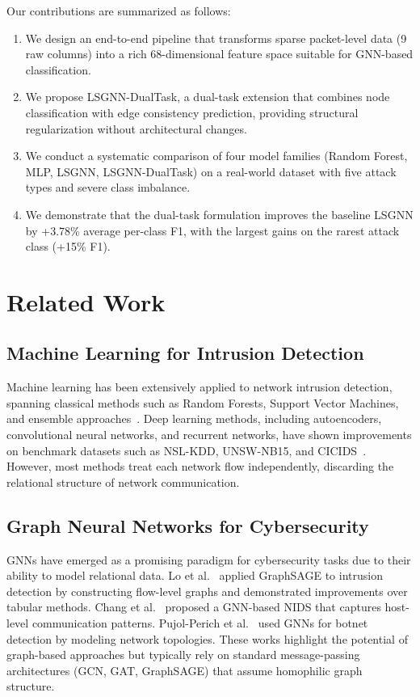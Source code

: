 \documentclass[conference]{IEEEtran}
\begin{document}
Our contributions are summarized as follows:
\begin{enumerate}
    \item We design an end-to-end pipeline that transforms sparse packet-level data (9 raw columns) into a rich 68-dimensional feature space suitable for GNN-based classification.
    \item We propose LSGNN-DualTask, a dual-task extension that combines node classification with edge consistency prediction, providing structural regularization without architectural changes.
    \item We conduct a systematic comparison of four model families (Random Forest, MLP, LSGNN, LSGNN-DualTask) on a real-world dataset with five attack types and severe class imbalance.
    \item We demonstrate that the dual-task formulation improves the baseline LSGNN by +3.78\% average per-class F1, with the largest gains on the rarest attack class (+15\% F1).
\end{enumerate}

\section{Related Work}

\subsection{Machine Learning for Intrusion Detection}

Machine learning has been extensively applied to network intrusion detection, spanning classical methods such as Random Forests, Support Vector Machines, and ensemble approaches~\cite{buczak2016survey}. Deep learning methods, including autoencoders, convolutional neural networks, and recurrent networks, have shown improvements on benchmark datasets such as NSL-KDD, UNSW-NB15, and CICIDS~\cite{ahmad2021network, ferrag2020deep}. However, most methods treat each network flow independently, discarding the relational structure of network communication.

\subsection{Graph Neural Networks for Cybersecurity}

GNNs have emerged as a promising paradigm for cybersecurity tasks due to their ability to model relational data. Lo et al.~\cite{lo2022graphsage_ids} applied GraphSAGE to intrusion detection by constructing flow-level graphs and demonstrated improvements over tabular methods. Chang et al.~\cite{chang2021gnn_nids} proposed a GNN-based NIDS that captures host-level communication patterns. Pujol-Perich et al.~\cite{pujol2022unveiling} used GNNs for botnet detection by modeling network topologies. These works highlight the potential of graph-based approaches but typically rely on standard message-passing architectures (GCN, GAT, GraphSAGE) that assume homophilic graph structure.
\end{document}

